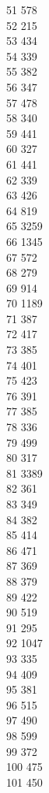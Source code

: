 { 51	578 \\
 52	215 \\
 53	434 \\
 54	339 \\
 55	382 \\
 56	347 \\
 57	478 \\
 58	340 \\
 59	441 \\
 60	327 \\
 61	441 \\
 62	339 \\
 63	426 \\
 64	819 \\
 65	3259 \\
 66	1345 \\
 67	572 \\
 68	279 \\
 69	914 \\
 70	1189 \\
 71	387 \\
 72	417 \\
 73	385 \\
 74	401 \\
 75	423 \\
 76	391 \\
 77	385 \\
 78	336 \\
 79	499 \\
 80	317 \\
 81	3389 \\
 82	361 \\
 83	349 \\
 84	382 \\
 85	414 \\
 86	471 \\
 87	369 \\
 88	379 \\
 89	422 \\
 90	519 \\
 91	295 \\
 92	1047 \\
 93	335 \\
 94	409 \\
 95	381 \\
 96	515 \\
 97	490 \\
 98	599 \\
 99	372 \\
 100	475 \\
 101	450 \\
}
